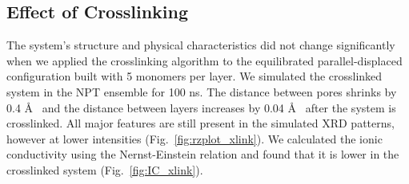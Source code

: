 \documentclass{article}
\newcommand{\angstrom}{\textup{\AA}}
\begin{document}
  \subsection{Effect of Crosslinking}\label{section:xlink}

  The system's structure and physical characteristics did not change
  significantly when we applied the crosslinking algorithm to the equilibrated
  parallel-displaced configuration built with 5 monomers per layer. We simulated
  the crosslinked system in the NPT ensemble for 100 ns. The distance between
  pores shrinks by 0.4 \angstrom~ and the distance between layers increases by
  0.04 \AA~ after the system is crosslinked. All major features are still present
  in the simulated XRD patterns, however at lower intensities
  (Fig.~\ref{fig:rzplot_xlink}). We calculated the ionic conductivity using the
  Nernst-Einstein relation and found that it is lower in the crosslinked system
  (Fig.~\ref{fig:IC_xlink}).
\end{document}

